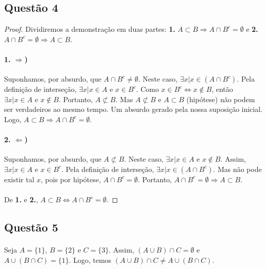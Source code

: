 \documentclass[11pt,a4paper]{report}
\begin{document}
    \subsection{Questão 4}
    \begin{proof}
    Dividiremos a demonstração em duas partes: \textbf{1.} $A \subset B \Rightarrow A \cap B^c = \emptyset$ e \textbf{2.} $A \cap B^c = \emptyset \Rightarrow A \subset B$.

    \paragraph{1. $\Rightarrow$)}
    Suponhamos, por absurdo, que $A \cap B^c \not= \emptyset$. Neste caso, $\exists x | x \in (A \cap B^c)$. Pela definição de interseção, $\exists x | x \in A $ e $x \in B^c$. Como $x \in B^c \Leftrightarrow x \not\in B$, então $\exists x | x \in A $ e $x \not\in B$. Portanto, $A \not\subset B$. Mas $A \not\subset B$ e $A \subset B$ (hipótese) não podem ser verdadeiros ao mesmo tempo. Um absurdo gerado pela nossa suposição inicial. Logo, $A \subset B \Rightarrow A \cap B^c = \emptyset$.

    \paragraph{2. $\Leftarrow$)}
    Suponhamos, por absurdo, que $A \not\subset B$. Neste caso, $\exists x | x \in A $ e $x \not\in B$. Assim, $\exists x | x \in A$ e $x \in B^c$. Pela definição de interseção, $\exists x | x \in (A \cap B^c)$. Mas não pode existir tal $x$, pois por hipótese, $A \cap B^c = \emptyset$. Portanto, $A \cap B^c = \emptyset \Rightarrow A \subset B$.
    
    \paragraph{}
    De \textbf{1.} e \textbf{2.}, $A \subset B \Leftrightarrow A \cap B^c = \emptyset$.
    \end{proof}


    \subsection{Questão 5}
    \paragraph{}
    Seja $A = \{1\}$, $B = \{2\}$ e $C = \{3\}$. Assim, $(A \cup B) \cap C = \emptyset$ e $A \cup(B \cap C) = \{1\}$. Logo, temos $(A \cup B) \cap C \not= A \cup (B \cap C)$.
\end{document}
